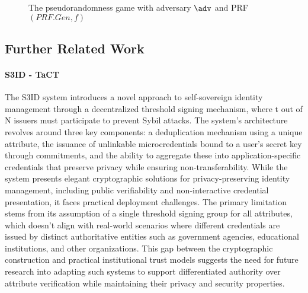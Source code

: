 \begin{figure}
\begin{pchstack}[boxed, center, space=1em]
\end{pchstack}
  \caption{The pseudorandomness game with adversary $\adv$ and PRF $(PRF.Gen, f)$}
  \label{fig:prf}
\end{figure}



\subsection{Further Related Work}
\paragraph{S3ID - TaCT}
The S3ID system introduces a novel approach to self-sovereign identity management through a decentralized threshold signing mechanism, where t out of N issuers must participate to prevent Sybil attacks. The system's architecture revolves around three key components: a deduplication mechanism using a unique attribute, the issuance of unlinkable microcredentials bound to a user's secret key through commitments, and the ability to aggregate these into application-specific credentials that preserve privacy while ensuring non-transferability. While the system presents elegant cryptographic solutions for privacy-preserving identity management, including public verifiability and non-interactive credential presentation, it faces practical deployment challenges. The primary limitation stems from its assumption of a single threshold signing group for all attributes, which doesn't align with real-world scenarios where different credentials are issued by distinct authoritative entities such as government agencies, educational institutions, and other organizations. This gap between the cryptographic construction and practical institutional trust models suggests the need for future research into adapting such systems to support differentiated authority over attribute verification while maintaining their privacy and security properties.

